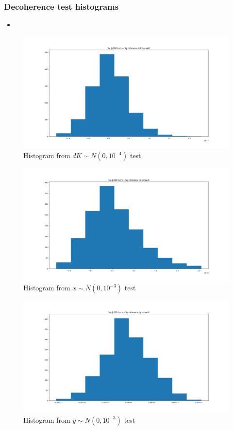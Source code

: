 \documentclass[pdf]{beamer}
\begin{document}
	\begin{frame}
		\frametitle{Decoherence test histograms}
		\begin{itemize}
			\item
		\end{itemize}
		\begin{figure}
			\includegraphics[scale=.25]{Sy_hist_dK}
			\caption{Histogram from $dK \sim N(0, 10^{-4})$ test}
		\end{figure}
	\end{frame}
	\begin{frame}
		\begin{figure}
			\includegraphics[scale=.3]{Sy_hist_x}
			\caption{Histogram from $x \sim N(0, 10^{-3})$ test}
		\end{figure}
	\end{frame}
	\begin{frame}
		\begin{figure}
			\includegraphics[scale=.3]{Sy_hist_y}
			\caption{Histogram from $y \sim N(0, 10^{-3})$ test}
		\end{figure}
	\end{frame}
\end{document}
